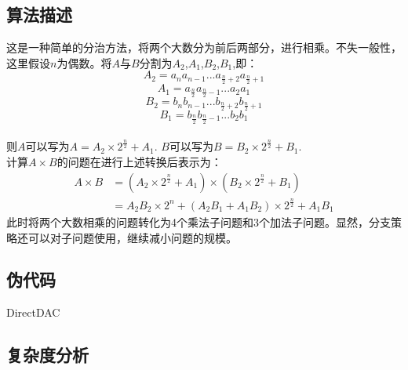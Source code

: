\subsection{算法描述}
这是一种简单的分治方法，将两个大数分为前后两部分，进行相乘。不失一般性，这里假设$n$为偶数。将$A$与$B$分割为$A_2$,$A_1$,$B_2$,$B_1$,即：
\begin{displaymath}
    A_2 = a_{n} a_{n-1} ... a_{\frac{n}{2} + 2} a_{\frac{n}{2} + 1}
\end{displaymath}
\begin{displaymath}
    A_1 = a_{\frac{n}{2}} a_{\frac{n}{2} - 1} ... a_2 a_1
\end{displaymath}
\begin{displaymath}
    B_2 = b_{n} b_{n-1} ... b_{\frac{n}{2} + 2} b_{\frac{n}{2} + 1}
\end{displaymath}
\begin{displaymath}
    B_1 = b_{\frac{n}{2}} b_{\frac{n}{2} - 1} ... b_2 b_1
\end{displaymath}\\
则$A$可以写为$A = A_2 \times 2^{\frac{n}{2}} + A_1$.
$B$可以写为$B = B_2 \times 2^{\frac{n}{2}} + B_1$.\\
计算$A \times B$的问题在进行上述转换后表示为：
\begin{displaymath}
    \begin{split}
        A \times B
        & = (A_2 \times 2^{\frac{n}{2}} + A_1) \times (B_2 \times 2^{\frac{n}{2}} + B_1) \\
        & = A_2 B_2 \times 2^n + (A_2 B_1 + A_1 B_2) \times 2^{\frac{n}{2}} + A_1 B_1
    \end{split}
\end{displaymath}
此时将两个大数相乘的问题转化为4个乘法子问题和3个加法子问题。显然，分支策略还可以对子问题使用，继续减小问题的规模。
\subsection{伪代码}
\begin{algorithm}
    \DontPrintSemicolon
    \caption{DirectDAC\label{IR}}
\end{algorithm}
\subsection{复杂度分析}
